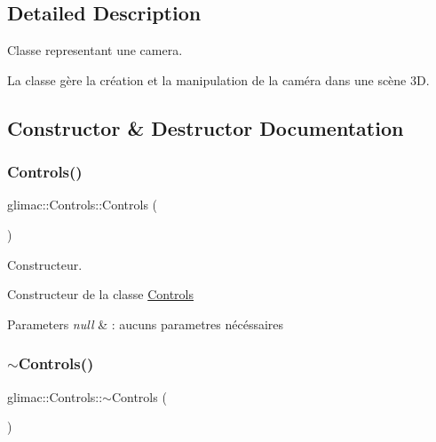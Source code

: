 \subsection{Detailed Description}
Classe representant une camera. 

La classe gère la création et la manipulation de la caméra dans une scène 3D. 

\subsection{Constructor \& Destructor Documentation}
\mbox{\label{classglimac_1_1Controls_a79e53d145de5f030bf72689db7bc928c}} 
\subsubsection{\texorpdfstring{Controls()}{Controls()}}
{\footnotesize\ttfamily glimac\+::\+Controls\+::\+Controls (\begin{DoxyParamCaption}{ }\end{DoxyParamCaption})}



Constructeur. 

Constructeur de la classe \hyperlink{classglimac_1_1Controls}{Controls}


\begin{DoxyParams}{Parameters}
{\em null} & \+: aucuns parametres nécéssaires \\
\hline
\end{DoxyParams}
\mbox{\label{classglimac_1_1Controls_ac2fdd147ad3c35e410b70a58559544e3}} 
\subsubsection{\texorpdfstring{$\sim$\+Controls()}{~Controls()}}
{\footnotesize\ttfamily glimac\+::\+Controls\+::$\sim$\+Controls (\begin{DoxyParamCaption}{ }\end{DoxyParamCaption})\hspace{0.3cm}{\ttfamily [inline]}}



